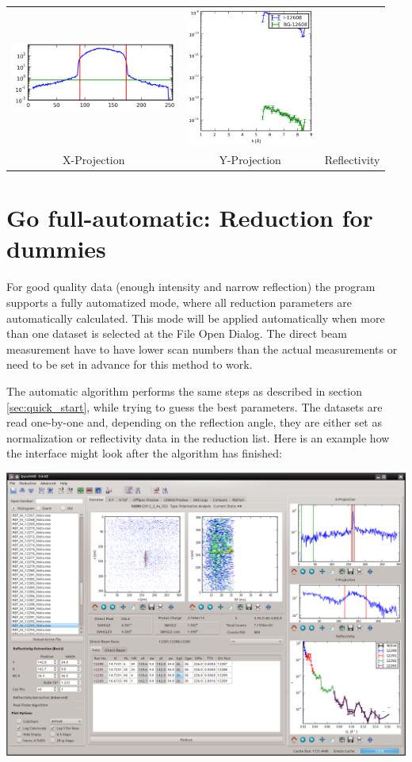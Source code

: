 \begin{tabular}{ccc}
  \includegraphics[width=155pt]{screenshots/normalize2.png} &
  \includegraphics[width=120pt]{screenshots/normalize3.png} \\
  X-Projection & Y-Projection & Reflectivity
  \end{tabular}



\section{Go full-automatic: Reduction for dummies}
  For good quality data (enough intensity and narrow reflection) the program supports a fully automatized mode, where all reduction parameters are automatically calculated.
  This mode will be applied automatically when more than one dataset is selected at the File Open Dialog.
  The direct beam measurement have to have lower scan numbers than the actual measurements or need to be set in advance for this method to work.
  
  The automatic algorithm performs the same steps as described in section \ref{sec:quick_start}, while trying to guess the best parameters.
  The datasets are read one-by-one and, depending on the reflection angle, they are either set as normalization or reflectivity data in the reduction list.
  Here is an example how the interface might look after the algorithm has finished:
  
  \includegraphics[width=460pt]{screenshots/overview.png}
  
